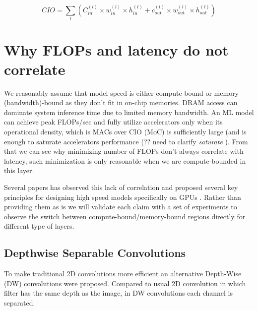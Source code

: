 \begin{equation}
    C I O=\sum_{l}\left(C_{in}^{(l)} \times w_{in}^{(l)} \times h_{in}^{(l)}+c_{o u t}^{(l)} \times w_{o u t}^{(l)} \times h_{o u t}^{(l)}\right)
    \label{eq: CIO}
\end{equation}

\section{Why FLOPs and latency do not correlate}




We reasonably assume that model speed is either compute-bound or memory-(bandwidth)-bound as they don't fit in on-chip memories. DRAM access can dominate system inference time due to limited memory bandwidth. An ML model can achieve peak FLOPs/sec and fully utilize accelerators only when its operational density, which is MACs over CIO (MoC) is sufficiently large (and is enough to saturate accelerators performance (?? need to clarify \textit{saturate} ). 
From that we can see why minimizing number of FLOPs don't always correlate with latency, such minimization is only reasonable when we are compute-bounded in this layer. 

Several papers has observed this lack of correlation and proposed several key principles for designing high speed models specifically on GPUs \cite{radosavovic2020_designing} \cite{lee2020_compounding_improvements}. Rather than providing them as is we will validate each claim with a set of experiments to observe the switch between compute-bound/memory-bound regions directly for different type of layers.

\subsection{Depthwise Separable Convolutions}

To make traditional 2D convolutions more efficient an alternative Depth-Wise (DW) convolutions were proposed. Compared to usual 2D convolution in which filter has the same depth as the image, in DW convolutions each channel is separated.

